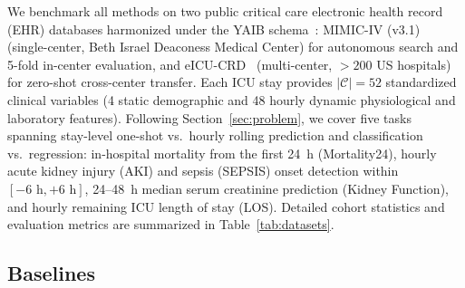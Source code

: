 We benchmark all methods on two public critical care electronic health record (EHR) databases harmonized under the YAIB schema~\cite{vandewater2024yaib}: MIMIC-IV (v3.1)~\cite{johnson2023mimic} (single-center, Beth Israel Deaconess Medical Center) for autonomous search and 5-fold in-center evaluation, and eICU-CRD~\cite{pollard2018eicu} (multi-center, $>200$ US hospitals) for zero-shot cross-center transfer. Each ICU stay provides $|\mathcal{C}|=52$ standardized clinical variables (4 static demographic and 48 hourly dynamic physiological and laboratory features). Following Section~\ref{sec:problem}, we cover five tasks spanning stay-level one-shot vs.\ hourly rolling prediction and classification vs.\ regression: in-hospital mortality from the first 24~h (Mortality24), hourly acute kidney injury (AKI) and sepsis (SEPSIS) onset detection within $[-6\text{ h}, +6\text{ h}]$, 24--48~h median serum creatinine prediction (Kidney Function), and hourly remaining ICU length of stay (LOS). Detailed cohort statistics and evaluation metrics are summarized in Table~\ref{tab:datasets}.

\subsection{Baselines}
\label{sec:baselines}

